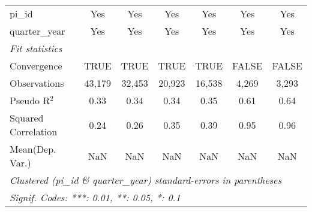 \begin{tabular}{lcccccc}
   pi\_id                                                     & Yes          & Yes          & Yes           & Yes           & Yes           & Yes\\  
   quarter\_year                                              & Yes          & Yes          & Yes           & Yes           & Yes           & Yes\\  
   \midrule
   \emph{Fit statistics}\\
   Convergence                                                &TRUE          & TRUE         & TRUE          & TRUE          & FALSE         & FALSE\\  
   Observations                                               & 43,179       & 32,453       & 20,923        & 16,538        & 4,269         & 3,293\\  
   Pseudo R$^2$                                               & 0.33         & 0.34         & 0.34          & 0.35          & 0.61          & 0.64\\  
   Squared Correlation                                        & 0.24         & 0.26         & 0.35          & 0.39          & 0.95          & 0.96\\  
Mean(Dep. Var.) & NaN & NaN & NaN & NaN & NaN & NaN \\
   \midrule \midrule
   \multicolumn{7}{l}{\emph{Clustered (pi\_id \& quarter\_year) standard-errors in parentheses}}\\
   \multicolumn{7}{l}{\emph{Signif. Codes: ***: 0.01, **: 0.05, *: 0.1}}\\
\end{tabular}
\par\endgroup
